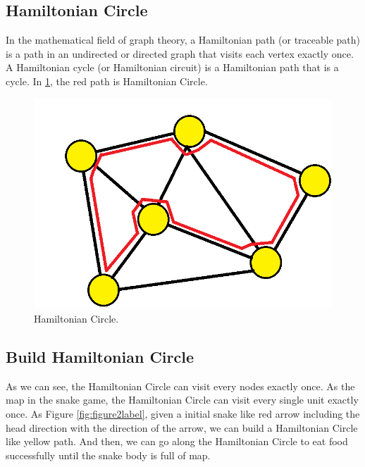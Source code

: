 \documentclass[12pt]{article}
\begin{document}
\subsection{Hamiltonian Circle}
In the mathematical field of graph theory, a Hamiltonian path (or traceable path) is a path in an undirected or directed graph that visits each vertex exactly once. A Hamiltonian cycle (or Hamiltonian circuit) is a Hamiltonian path that is a cycle. In \ref{fig:figure1label}, the red path is Hamiltonian Circle. 
    
\begin{figure}[H]
\centering 
\includegraphics[scale = 0.4]{Hamiltonian.png}
\caption{Hamiltonian Circle.}
\label{fig:figure1label}
\end{figure}

\subsection{Build Hamiltonian Circle}
As we can see, the Hamiltonian Circle can visit every nodes exactly once. As the map in the snake game, the Hamiltonian Circle can visit every single unit exactly once. As Figure \ref{fig:figure2label}, given a initial snake like red arrow including the head direction with the direction of the arrow, we can build a Hamiltonian Circle like yellow path. And then, we can go along the Hamiltonian Circle to eat food successfully until the snake body is full of map. 
\end{document}

